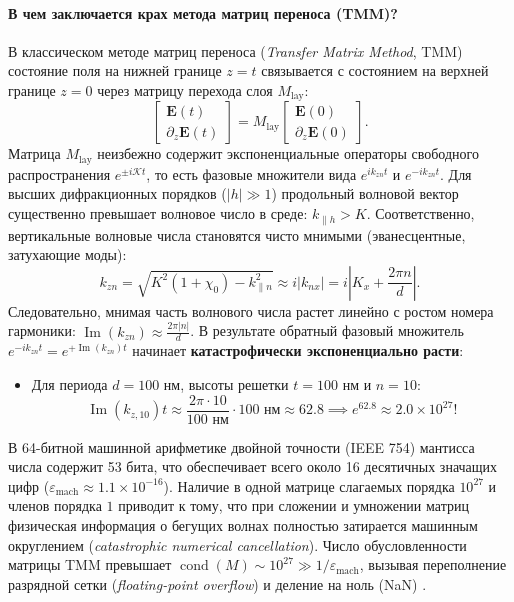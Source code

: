 \documentclass[a4paper,11pt]{article}
\begin{document}
\paragraph{В чем заключается крах метода матриц переноса (TMM)?}
В классическом методе матриц переноса (\textit{Transfer Matrix Method}, TMM) состояние поля на нижней границе $z = t$ связывается с состоянием на верхней границе $z = 0$ через матрицу перехода слоя $M_{\text{lay}}$:
\begin{equation}
    \begin{bmatrix} \mathbf{E}(t) \\ \partial_z \mathbf{E}(t) \end{bmatrix} = M_{\text{lay}} \begin{bmatrix} \mathbf{E}(0) \\ \partial_z \mathbf{E}(0) \end{bmatrix}.
\end{equation}
Матрица $M_{\text{lay}}$ неизбежно содержит экспоненциальные операторы свободного распространения $e^{\pm i \mathcal{K} t}$, то есть фазовые множители вида $e^{i k_{zn} t}$ и $e^{-i k_{zn} t}$.
Для высших дифракционных порядков ($|h| \gg 1$) продольный волновой вектор существенно превышает волновое число в среде: $k_{\parallel h} > K$. Соответственно, вертикальные волновые числа становятся чисто мнимыми (эванесцентные, затухающие моды):
\begin{equation}
    k_{zn} = \sqrt{K^2(1 + \chi_0) - k_{\parallel n}^2} \approx i |k_{nx}| = i \left| K_x + \frac{2\pi n}{d} \right|.
\end{equation}
Следовательно, мнимая часть волнового числа растет линейно с ростом номера гармоники: $\operatorname{Im}(k_{zn}) \approx \frac{2\pi |n|}{d}$.
В результате обратный фазовый множитель $e^{-i k_{zn} t} = e^{+\operatorname{Im}(k_{zn}) t}$ начинает \textbf{катастрофически экспоненциально расти}:
\begin{itemize}
    \item Для периода $d = 100$ нм, высоты решетки $t = 100$ нм и $n = 10$:
    \begin{equation}
        \operatorname{Im}(k_{z, 10}) t \approx \frac{2\pi \cdot 10}{100\text{ нм}} \cdot 100\text{ нм} \approx 62.8 \implies e^{62.8} \approx 2.0 \times 10^{27}!
    \end{equation}
\end{itemize}
В 64-битной машинной арифметике двойной точности (IEEE 754) мантисса числа содержит 53 бита, что обеспечивает всего около 16 десятичных значащих цифр ($\varepsilon_{\text{mach}} \approx 1.1 \times 10^{-16}$). 
Наличие в одной матрице слагаемых порядка $10^{27}$ и членов порядка $1$ приводит к тому, что при сложении и умножении матриц физическая информация о бегущих волнах полностью затирается машинным округлением (\textit{catastrophic numerical cancellation}). Число обусловленности матрицы TMM превышает $\operatorname{cond}(M) \sim 10^{27} \gg 1/\varepsilon_{\text{mach}}$, вызывая переполнение разрядной сетки (\textit{floating-point overflow}) и деление на ноль (NaN) \cite{hench_strakos, mikulik_rcwa}.
\end{document}
